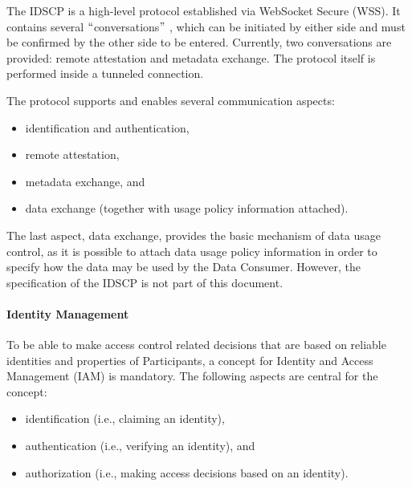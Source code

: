 

The IDSCP is a high-level protocol established via WebSocket Secure (WSS). It contains several $``$conversations$"$ , which can be initiated by either side and must be confirmed by the other side to be entered. Currently, two conversations are provided: remote attestation and metadata exchange. The protocol itself is performed inside a tunneled connection.

The protocol supports and enables several communication aspects:

\begin{itemize}
	\item identification and authentication,

	\item remote attestation,

	\item metadata exchange, and

	\item data exchange (together with usage policy information attached).

\end{itemize}

The last aspect, data exchange, provides the basic mechanism of data usage control, as it is possible to attach data usage policy information in order to specify how the data may be used by the Data Consumer. However, the specification of the IDSCP is not part of this document.

\paragraph{Identity Management\\}
To be able to make access control related decisions that are based on reliable identities and properties of Participants, a concept for Identity and Access Management (IAM) is mandatory. The following aspects are central for the concept:

\begin{itemize}
	\item identification (i.e., claiming an identity),

	\item authentication (i.e., verifying an identity), and

	\item authorization (i.e., making access decisions based on an identity).
\end{itemize}

